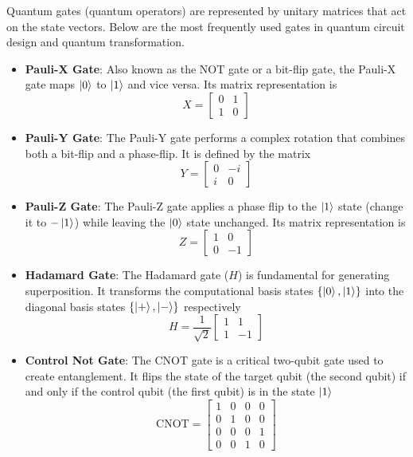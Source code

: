 \documentclass[11pt, letterpaper]{article}
\begin{document}
Quantum gates (quantum operators) are represented by unitary matrices that act on the state vectors. Below are the most frequently used gates in quantum circuit design and quantum transformation.
\begin{itemize}
  \item \textbf{Pauli-X Gate}: Also known as the NOT gate or a bit-flip gate, the Pauli-X gate maps $\ket{0}$ to $\ket{1}$ and vice versa. Its matrix representation is
  \begin{equation}
    X = \begin{bmatrix} 0 & 1 \\ 1 & 0 \end{bmatrix}
  \end{equation}
  \item \textbf{Pauli-Y Gate}: The Pauli-Y gate performs a complex rotation that combines both a bit-flip and a phase-flip. It is defined by the matrix
  \begin{equation}
    Y = \begin{bmatrix} 0 & -i \\ i & 0 \end{bmatrix}
  \end{equation}
  \item \textbf{Pauli-Z Gate}: The Pauli-Z gate applies a phase flip to the $\ket{1}$ state (change it to $-\ket{1}$) while leaving the $\ket{0}$ state unchanged. Its matrix representation is
  \begin{equation}
    Z = \begin{bmatrix} 1 & 0 \\ 0 & -1 \end{bmatrix}
  \end{equation}
  \item \textbf{Hadamard Gate}: The Hadamard gate ($H$) is fundamental for generating superposition. It transforms the computational basis states $\{\ket{0}, \ket{1}\}$ into the diagonal basis states $\{\ket{+}, \ket{-}\}$ respectively
  \begin{equation}
    H = \frac{1}{\sqrt{2}} \begin{bmatrix} 1 & 1 \\ 1 & -1 \end{bmatrix}
  \end{equation}
  \item \textbf{Control Not Gate}: The CNOT gate is a critical two-qubit gate used to create entanglement. It flips the state of the target qubit (the second qubit) if and only if the control qubit (the first qubit) is in the state $\ket{1}$
  \begin{equation}
    \text{CNOT} = \begin{bmatrix} 1 & 0 & 0 & 0 \\ 0 & 1 & 0 & 0 \\ 0 & 0 & 0 & 1 \\ 0 & 0 & 1 & 0 \end{bmatrix}
  \end{equation}
\end{itemize}
\end{document}
